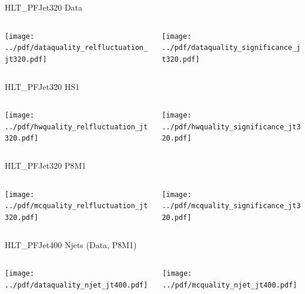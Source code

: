\documentclass[9pt]{beamer}
\begin{document}
\begin{frame}[t]{HLT\_PFJet320 Data}
\begin{columns}[T]
  \begin{column}{.5\textwidth}
  \texttt{[image: ../pdf/dataquality\_relfluctuation\_jt320.pdf]}
  \end{column}
  \begin{column}{.5\textwidth}
  \texttt{[image: ../pdf/dataquality\_significance\_jt320.pdf]}
  \end{column}
\end{columns}
\end{frame}

\begin{frame}[t]{HLT\_PFJet320 HS1}
\begin{columns}[T]
  \begin{column}{.5\textwidth}
  \texttt{[image: ../pdf/hwquality\_relfluctuation\_jt320.pdf]}
  \end{column}
  \begin{column}{.5\textwidth}
  \texttt{[image: ../pdf/hwquality\_significance\_jt320.pdf]}
  \end{column}
\end{columns}
\end{frame}

\begin{frame}[t]{HLT\_PFJet320 P8M1}
\begin{columns}[T]
  \begin{column}{.5\textwidth}
  \texttt{[image: ../pdf/mcquality\_relfluctuation\_jt320.pdf]}
  \end{column}
  \begin{column}{.5\textwidth}
  \texttt{[image: ../pdf/mcquality\_significance\_jt320.pdf]}
  \end{column}
\end{columns}
\end{frame}


\begin{frame}[t]{HLT\_PFJet400 Njets (Data, P8M1)}
\begin{columns}[T]
  \begin{column}{.5\textwidth}
  \texttt{[image: ../pdf/dataquality\_njet\_jt400.pdf]}
  \end{column}
  \begin{column}{.5\textwidth}
  \texttt{[image: ../pdf/mcquality\_njet\_jt400.pdf]}
  \end{column}
\end{columns}
\end{frame}
\end{document}
